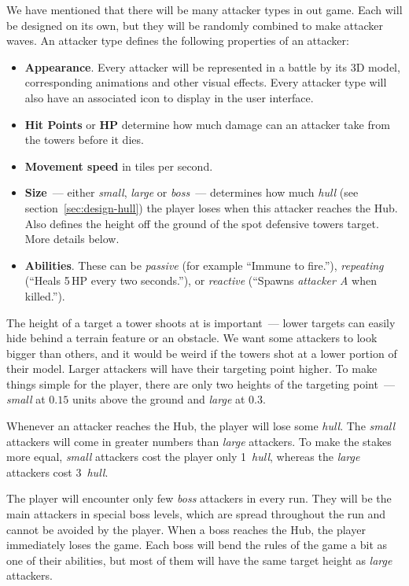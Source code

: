 We have mentioned that there will be many attacker types in out game.
Each will be designed on its own, but they will be randomly combined to make attacker waves.
An attacker type defines the following properties of an attacker:
\begin{itemize}
    \item \textbf{Appearance}. Every attacker will be represented in a battle by its 3D model, corresponding animations and other visual effects. Every attacker type will also have an associated icon to display in the user interface.
    \item \textbf{Hit Points} or \textbf{HP} determine how much damage can an attacker take from the towers before it dies.
    \item \textbf{Movement speed} in tiles per second.
    \item \textbf{Size}~--- either \emph{small}, \emph{large} or \emph{boss}~--- determines how much \emph{hull} (see section~\ref{sec:design-hull}) the player loses when this attacker reaches the Hub. Also defines the height off the ground of the spot defensive towers target. More details below.
    \item \textbf{Abilities}. These can be \emph{passive} (for example \enquote{Immune to fire.}), \emph{repeating} (\enquote{Heals 5\,HP every two seconds.}), or \emph{reactive} (\enquote{Spawns \emph{attacker A} when killed.}).
\end{itemize}

The height of a target a tower shoots at is important~--- lower targets can easily hide behind a terrain feature or an obstacle.
We want some attackers to look bigger than others, and it would be weird if the towers shot at a lower portion of their model.
Larger attackers will have their targeting point higher.
To make things simple for the player, there are only two heights of the targeting point~--- \emph{small} at $0.15$ units above the ground and \emph{large} at $0.3$.

Whenever an attacker reaches the Hub, the player will lose some \emph{hull}.
The \emph{small} attackers will come in greater numbers than \emph{large} attackers.
To make the stakes more equal, \emph{small} attackers cost the player only 1~\emph{hull}, whereas the \emph{large} attackers cost 3~\emph{hull}.

\begin{notindemo}
    The player will encounter only few \emph{boss} attackers in every run.
    They will be the main attackers in special boss levels, which are spread throughout the run and cannot be avoided by the player.
    When a boss reaches the Hub, the player immediately loses the game.
    Each boss will bend the rules of the game a bit as one of their abilities, but most of them will have the same target height as \emph{large} attackers.
\end{notindemo}

